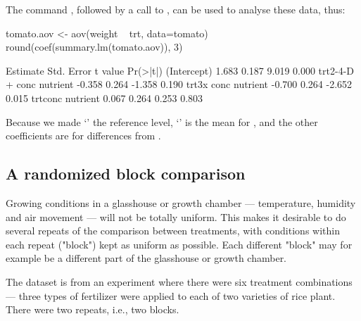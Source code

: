 The command , followed by a call to ,
can be used to analyse these data, thus:
\begin{Schunk}
\begin{Sinput}
tomato.aov <- aov(weight ~ trt, data=tomato)
round(coef(summary.lm(tomato.aov)), 3)
\end{Sinput}
\end{Schunk}
\begin{fullwidth}

\begin{Schunk}
\begin{Soutput}
                         Estimate Std. Error t value Pr(>|t|)
(Intercept)                 1.683      0.187   9.019    0.000
trt2-4-D + conc nutrient   -0.358      0.264  -1.358    0.190
trt3x conc nutrient        -0.700      0.264  -2.652    0.015
trtconc nutrient            0.067      0.264   0.253    0.803
\end{Soutput}
\end{Schunk}

\end{fullwidth}
Because we made `' the reference level,
`' is the mean for , and the
other coefficients are for differences from .

\subsection*{A randomized block comparison}

Growing conditions in a glasshouse or growth chamber ---
temperature, humidity and air movement --- will not be totally
uniform. This makes it desirable to do several repeats of the
comparison between treatments, with conditions
within each repeat  ("block") kept as uniform as possible.
Each different "block" may for example be a different part of
the glasshouse or growth chamber.

The dataset  is from an experiment
where there were six treatment combinations ---
three types of fertilizer were applied to each of two varieties
of rice plant.  There were two repeats, i.e., two blocks.

